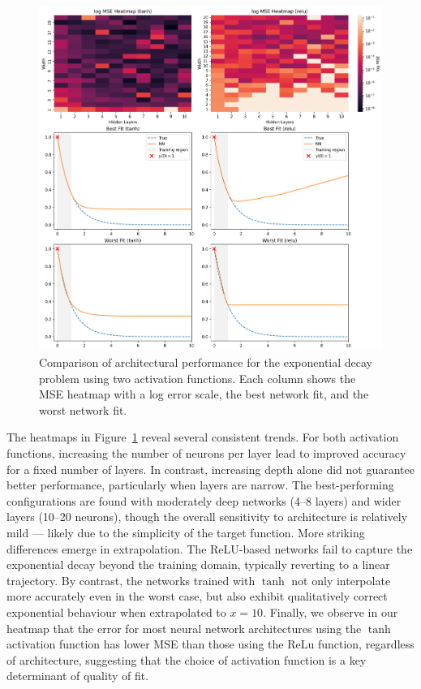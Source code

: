 \begin{figure}[htbp]
    \centering
    \includegraphics[width=\textwidth]{graphics/ivp_exponential_combined.png}
    \caption{Comparison of architectural performance for the exponential decay problem using two 
    activation functions. Each column shows the MSE heatmap with a log error scale,
    the best network fit, and the worst network fit.}
    \label{fig:expdecay_sidebyside}
\end{figure}


The heatmaps in Figure~\ref{fig:expdecay_sidebyside} reveal several consistent trends. For 
both activation functions, increasing the number of neurons per layer lead to improved 
accuracy for a fixed number of layers. In contrast, increasing depth alone did not guarantee better 
performance, particularly when layers are narrow. The best-performing configurations are found with 
moderately deep networks (4--8 layers) and wider layers (10--20 neurons), though the overall 
sensitivity to architecture is relatively mild — likely due to the simplicity of the target 
function. More striking differences emerge in extrapolation. The ReLU-based networks fail to 
capture the exponential decay beyond the training domain, typically reverting to a linear 
trajectory. By contrast, the networks trained with \(\tanh\) not only interpolate more accurately 
even in the worst case, but also exhibit qualitatively correct exponential behaviour when extrapolated 
to \(x = 10\). Finally, we observe in our heatmap that the error for most neural network architectures 
using the $\tanh$ activation function has lower MSE than those using the ReLu function, regardless 
of architecture, suggesting that the choice of activation function is a key determinant of quality of 
fit.



